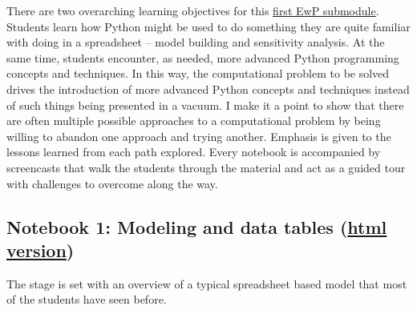 \documentclass[ited,blindrev]{informs3}              %
\begin{document}
There are two overarching learning objectives for this \href{http://www.sba.oakland.edu/faculty/isken/courses/mis6900/mod3a_whatif.html}{first EwP submodule}. Students learn how Python might be used to do something they are quite familiar with doing in a spreadsheet -- model building and sensitivity analysis. At the same time, students encounter, as needed, more advanced Python programming concepts and techniques. In this way, the computational problem to be solved drives the introduction of more advanced Python concepts and techniques instead of such things being presented in a vacuum. I make it a point to show that there are often multiple possible approaches to a computational problem by being willing to abandon one approach and trying another. Emphasis is given to the lessons learned from each path explored. Every notebook is accompanied by screencasts that walk the students through the material and act as a guided tour with challenges to overcome along the way. 
 
 
\subsection{Notebook 1: Modeling and data tables (\href{http://www.sba.oakland.edu/faculty/isken/excel_with_python/what_if_1_model_datatable.html}{html version})}

The stage is set with an overview of a typical spreadsheet based model that most of the students have seen before. 
\end{document}
